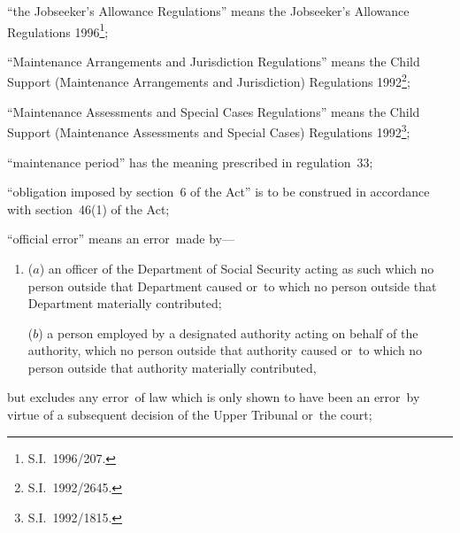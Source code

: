 \documentclass[a4paper,12pt]{article}
\begin{document}
\begin{enumerate}
\begin{sloppypar}
“the Jobseeker’s Allowance Regulations” means the Jobseeker’s Allowance Regulations 1996\footnote{\frenchspacing S.I.~1996/207.};
\end{sloppypar}

“Maintenance Arrangements and Jurisdiction Regulations” means the Child Support (Maintenance Arrangements and Jurisdiction) Regulations 1992\footnote{\frenchspacing S.I.~1992/2645.};

“Maintenance Assessments and Special Cases Regulations” means the Child Support (Maintenance Assessments and Special Cases) Regulations 1992\footnote{\frenchspacing S.I.~1992/1815.};

“maintenance period” has the meaning prescribed in regulation~33;

“obligation imposed by section~6 of the Act” is to be construed in accordance with section~46(1) of the Act;


“official error” means an error~made by—
\begin{enumerate}\item[]
    ($a$) 
    an officer of the Department of Social Security acting as such which no person outside that Department caused or~to which no person outside that Department materially contributed;



($b$) a person employed by a designated authority acting on behalf of the authority, which no person outside that authority caused or~to which no person outside that authority materially contributed,
\end{enumerate}
but excludes any error~of law which is only shown to have been an error~by virtue of a subsequent decision of 
the Upper Tribunal  %
or~the court;


\end{enumerate}
\end{document}
